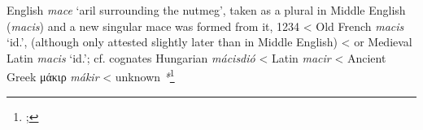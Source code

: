 \begin{etymology}\label{ety:mace}
English \textit{mace} `aril surrounding the nutmeg', taken as a plural in Middle English (\textit{macis}) and a new singular mace was formed from it, 1234
< Old French \textit{macis} `id.', (although only attested slightly later than in Middle English)
< or Medieval Latin \textit{macis} `id.'; cf. cognates Hungarian \textit{mácisdió}
< Latin \textit{macir}
< Ancient Greek {μάκιρ} \textit{mákir}
< unknown \textit{*}\footnote{; }
\end{etymology}